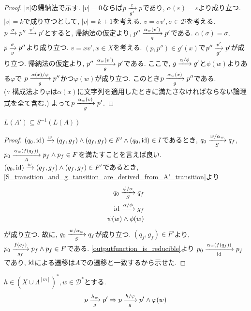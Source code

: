 \documentclass[uplatex,dvipdfmx,a4j]{jsreport}
\begin{document}
  \begin{proof}
    $|v|$の帰納法で示す.
    $|v| = 0$ならば$p \transarrow{\varepsilon}{g'} p$であり,
    $\alpha(\varepsilon) = \varepsilon$より成り立つ.
    $|v| = k$で成り立つとして, $|v| = k + 1$を考える.
    $v = \sigma v', \sigma \in \mathcal{D}$を考える.
    $p \transarrow{\sigma}{} p'' \transarrow{v'}{} p'$とすると,
    帰納法の仮定より, $p'' \transarrow{\alpha_w(v')}{g} p'$である.
    $\alpha(\sigma) = \sigma$, $p \transarrow{\sigma}{g} p''$より成り立つ.
    $v = x v', x \in X$を考える.
    $(p, p'') \in g'(x)$で$p'' \transarrow{v'}{g'} p'$が成り立つ.
    帰納法の仮定より, $p'' \transarrow{\alpha_w(v')}{g} p'$である.
    ここで, $g \transarrow{\alpha / \phi}{} g'$と$\phi(w)$よりある$\varphi$で
    $p \transarrow{\alpha(x) / \varphi}{g} p''$かつ$\varphi(w)$が成り立つ.
    このとき$p \transarrow{\alpha_w(x)}{g} p''$である. \\
    ($\because$
    構成法より$\varphi$は$\alpha(x)$に文字列を適用したときに満たさなければならない論理式を全て含む.)
    よって$p \transarrow{\alpha_w(v)}{g} p'$.
  \end{proof}

  \begin{theorem} \label{symbolic_soundness}
    $L(A') \subseteq S^{-1}(L(A))$
  \end{theorem}

  \begin{proof}
    $(q_0, \id) \transarrow{w}{} (q_f, g_f) \land (q_f, g_f) \in F' \land (q_0, \id) \in I$であるとき,
    $q_0 \transarrow{w / \alpha_w}{S} q_f$,
    $p_0 \transarrow{\alpha_w(f(q_f))}{A} p_f \land p_f \in F$を満たすことを言えば良い.
    $(q_0, \id) \transarrow{w}{} (q_f, g_f) \land (q_f, g_f) \in F'$であるとき,
    \ref{S_transition_and_g_tansition_are_derived_from_A'_transition}より
    \begin{align*}
      q_0 \transarrow{\psi / \alpha}{S} q_f \\
      \id \transarrow{\alpha / \phi}{} g_f \\
      \psi(w) \land \phi(w)
    \end{align*}
    が成り立つ.
    故に, $q_0 \transarrow{w / \alpha_w}{S} q_f$が成り立つ.
    $(q_f, g_f) \in F'$より,
    $p_0 \transarrow{f(q_f)}{g_f} p_f \land p_f \in F$である.
    \ref{outputfunction_is_reducible}より
    $p_0 \transarrow{\alpha_w(f(q_f))}{\scriptsize \id} p_f$であり,
    $\id$による遷移は$A$での遷移と一致するから示せた.
  \end{proof}

  \begin{lemma} \label{outputfunction_is_derivable}
    $h \in (X \cup \Lambda^{[m]})^*, w \in \mathcal{D}^*$とする.
    \[
      p \transarrow{h_w}{g} p' \Rightarrow p \transarrow{h / \varphi}{g} p' \land \varphi(w)
    \]
  \end{lemma}
\end{document}
